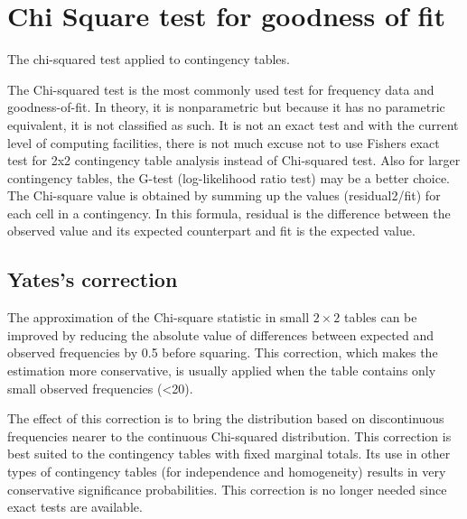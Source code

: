 


\section{Chi Square test for goodness of fit}

The chi-squared test applied to contingency tables.

The Chi-squared test is the most commonly used test for frequency data and goodness-of-fit. In theory, it is nonparametric but because it has no parametric equivalent, it is not classified as such. It is not an exact test and with the current level of computing facilities, there is not much excuse not to use Fishers exact test for 2x2 contingency table analysis instead of Chi-squared test. Also for larger contingency tables, the G-test (log-likelihood ratio test) may be a better choice. The Chi-square value is obtained by summing up the values (residual2/fit) for each cell in a contingency. In this formula, residual is the difference between the observed value and its expected counterpart and fit is the expected value.



\subsection{Yates's correction}

The approximation of the Chi-square statistic in small $2\times2$ tables can be improved by reducing the absolute value of differences between expected and observed frequencies by 0.5 before squaring. This correction, which makes the estimation more conservative, is usually applied when the table contains only small observed frequencies (<20).

The effect of this correction is to bring the distribution based on discontinuous frequencies nearer to the continuous Chi-squared distribution. This correction is best suited to the contingency tables with fixed marginal totals. Its use in other types of contingency tables (for independence and homogeneity) results in very conservative significance probabilities. This correction is no longer needed since exact tests are available.




